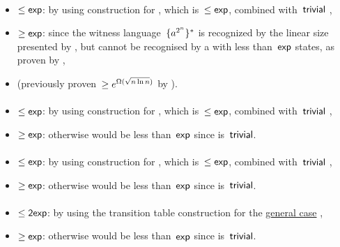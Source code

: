\paragraph{\ODLA{}\tto\TNFA}\label{cost:1DLAto2NFAu}
\begin{itemize}
	\item $\le\mathsf{exp}$: by using construction for \hyperref[cost:1DLAto1DFAu]{\ODLA{}\tto\ODFA}, which is~$\le\mathsf{exp}$, combined with~$\mathsf{trivial}$ \ODFA{}\tto\TNFA,
	\item $\ge\mathsf{exp}$: since the witness language~$\{a^{2^n}\}^*$ is recognized by the linear size \ODLA presented by , but cannot be recognised by a \TNFA with less than~$\mathsf{exp}$ states, as proven by ,
	\item (previously proven~$\ge e^{\Omega(\sqrt{n\ln n})}$ by ).
\end{itemize}
\paragraph{\ODLA{}\tto\ONFA}\label{cost:1LAto1NFAu}
\begin{itemize}
	\item $\le\mathsf{exp}$: by using construction for \hyperref[cost:1DLAto1DFAu]{\ODLA{}\tto\ODFA}, which is~$\le\mathsf{exp}$, combined with~$\mathsf{trivial}$ \ODFA{}\tto\ONFA,
	\item $\ge\mathsf{exp}$: otherwise \hyperref[cost:1DLAto2NFAu]{\ODLA{}\tto\TNFA} would be less than~$\mathsf{exp}$ since \ONFA{}\tto\TNFA is~$\mathsf{trivial}$.
\end{itemize}
\paragraph{\ODLA{}\tto\TDFA}\label{cost:1DLAto2DFAu}
\begin{itemize}
	\item $\le\mathsf{exp}$: by using construction for \hyperref[cost:1DLAto1DFAu]{\ODLA{}\tto\ODFA}, which is~$\le\mathsf{exp}$, combined with~$\mathsf{trivial}$ \ODFA{}\tto\TDFA,
	\item $\ge\mathsf{exp}$: otherwise \hyperref[cost:1DLAto2NFAu]{\ODLA{}\tto\TNFA} would be less than~$\mathsf{exp}$ since \TDFA{}\tto\TNFA is~$\mathsf{trivial}$.
\end{itemize}
\paragraph{\OLA{}\tto\ODFA}
\begin{itemize}
	\item $\le\mathsf{2exp}$: by using the transition table construction for the \hyperref[cost:1LAto1DFA]{general case} \cite{PigPis14},
	\item $\ge\mathsf{exp}$: otherwise \hyperref[cost:1DLAto1DFAu]{\ODLA{}\tto\ODFA} would be less than~$\mathsf{exp}$ since \ODLA{}\tto\OLA is~$\mathsf{trivial}$.
\end{itemize}

